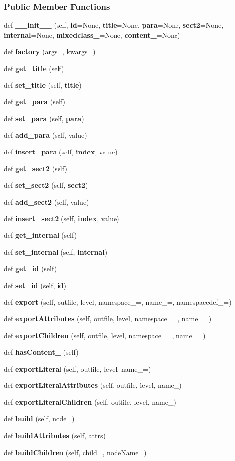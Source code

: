 \subsubsection*{Public Member Functions}
\begin{DoxyCompactItemize}
\item 
def {\bf \+\_\+\+\_\+init\+\_\+\+\_\+} (self, {\bf id}=None, {\bf title}=None, {\bf para}=None, {\bf sect2}=None, {\bf internal}=None, {\bf mixedclass\+\_\+}=None, {\bf content\+\_\+}=None)
\item 
def {\bf factory} (args\+\_\+, kwargs\+\_\+)
\item 
def {\bf get\+\_\+title} (self)
\item 
def {\bf set\+\_\+title} (self, {\bf title})
\item 
def {\bf get\+\_\+para} (self)
\item 
def {\bf set\+\_\+para} (self, {\bf para})
\item 
def {\bf add\+\_\+para} (self, value)
\item 
def {\bf insert\+\_\+para} (self, {\bf index}, value)
\item 
def {\bf get\+\_\+sect2} (self)
\item 
def {\bf set\+\_\+sect2} (self, {\bf sect2})
\item 
def {\bf add\+\_\+sect2} (self, value)
\item 
def {\bf insert\+\_\+sect2} (self, {\bf index}, value)
\item 
def {\bf get\+\_\+internal} (self)
\item 
def {\bf set\+\_\+internal} (self, {\bf internal})
\item 
def {\bf get\+\_\+id} (self)
\item 
def {\bf set\+\_\+id} (self, {\bf id})
\item 
def {\bf export} (self, outfile, level, namespace\+\_\+=\textquotesingle{}\textquotesingle{}, name\+\_\+=\textquotesingle{}, namespacedef\+\_\+=\textquotesingle{}\textquotesingle{})
\item 
def {\bf export\+Attributes} (self, outfile, level, namespace\+\_\+=\textquotesingle{}\textquotesingle{}, name\+\_\+=\textquotesingle{})
\item 
def {\bf export\+Children} (self, outfile, level, namespace\+\_\+=\textquotesingle{}\textquotesingle{}, name\+\_\+=\textquotesingle{})
\item 
def {\bf has\+Content\+\_\+} (self)
\item 
def {\bf export\+Literal} (self, outfile, level, name\+\_\+=\textquotesingle{})
\item 
def {\bf export\+Literal\+Attributes} (self, outfile, level, name\+\_\+)
\item 
def {\bf export\+Literal\+Children} (self, outfile, level, name\+\_\+)
\item 
def {\bf build} (self, node\+\_\+)
\item 
def {\bf build\+Attributes} (self, attrs)
\item 
def {\bf build\+Children} (self, child\+\_\+, node\+Name\+\_\+)
\end{DoxyCompactItemize}
